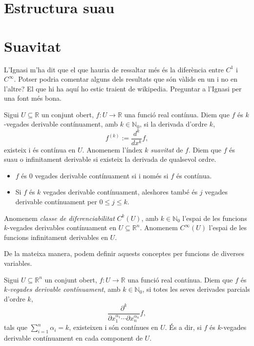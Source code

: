 \section{Estructura suau}


















\newpage
\section{Suavitat}
{\color{blue} L'Ignasi m'ha dit que el que hauria de ressaltar més és la diferència entre $C^1$ i $C^\infty$. Potser podria comentar alguns dels resultats que són vàlids en un i no en l'altre?}
{\color{blue} El que hi ha aquí ho estic traient de wikipedia. Preguntar a l'Ignasi per una font més bona.}
\begin{defi}
    Sigui $U\subseteq\mathbb R$ un conjunt obert, $f:U\to\mathbb R$ una funció real contínua.
    Diem que $f$ és {\normalfont $k$-vegades derivable contínuament}, amb $k\in\mathbb N_0$, si la derivada d'ordre $k$, $$f^{(k)}:= \frac{d^k}{dx^k}f,$$ existeix i és contínua en $U$. Anomenem l'índex $k$ \textit{suavitat} de $f$.
    Diem que $f$ és {\normalfont suau} o {\normalfont infinitament derivable} si existeix la derivada de qualsevol ordre.
\end{defi}
\begin{obss}
\end{obss}
\begin{itemize}
    \item $f$ és $0$ vegades derivable contínuament si i només si $f$ és contínua. 
    \item Si $f$ és $k$ vegades derivable contínuament, aleshores també és $j$ vegades derivable contínuament per $0\le j\le k$.
\end{itemize}
\begin{defi}
    Anomenem \textit{classe de diferenciabilitat} $C^k(U)$, amb $k\in\mathbb N_0$ l'espai de les funcions $k$-vegades derivables contínuament en $U\subseteq\mathbb R^n$. Anomenem $C^\infty(U)$ l'espai de les funcions infinitament derivables en $U$.
\end{defi}
De la mateixa manera, podem definir aquests conceptes per funcions de diverses variables.
\begin{defi}
    Sigui $U\subseteq\mathbb R^n$ un conjunt obert, $f:U\to\mathbb R$ una funció real contínua.
    Diem que $f$ és \textit{$k$-vegades derivable contínuament}, amb $k\in\mathbb N_0$, si totes les seves derivades parcials d'ordre $k$, $$\frac{\partial^k}{\partial x_1^{\alpha_1}\cdots\partial x_n^{\alpha_n}}f,$$ tals que $\sum_{i=1}^n\alpha_i = k$, existeixen i són contínues en $U$. És a dir, si $f$ és $k$-vegades derivable contínuament en cada component de $U$.
\end{defi}
